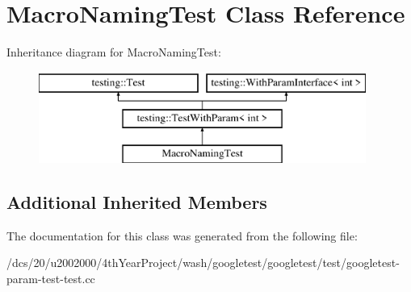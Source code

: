 \hypertarget{classMacroNamingTest}{}\section{Macro\+Naming\+Test Class Reference}
\label{classMacroNamingTest}
Inheritance diagram for Macro\+Naming\+Test\+:\begin{figure}[H]
\begin{center}
\leavevmode
\includegraphics[height=3.000000cm]{classMacroNamingTest}
\end{center}
\end{figure}
\subsection*{Additional Inherited Members}


The documentation for this class was generated from the following file\+:\begin{DoxyCompactItemize}
\item 
/dcs/20/u2002000/4th\+Year\+Project/wash/googletest/googletest/test/googletest-\/param-\/test-\/test.\+cc\end{DoxyCompactItemize}
